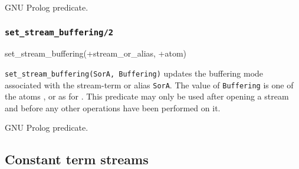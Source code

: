 \Portability

GNU Prolog predicate.

\subsubsection{\texttt{set\_stream\_buffering/2}}
\label{set-stream-buffering/2}

\begin{TemplatesOneCol}
set\_stream\_buffering(+stream\_or\_alias, +atom)

\end{TemplatesOneCol}

\Description

\texttt{set\_stream\_buffering(SorA, Buffering)}
updates the buffering mode associated with the stream-term or alias
\texttt{SorA}. The value of \texttt{Buffering} is one of the atoms
,  or  as for 
. This predicate may only be used after opening a stream
and before any other operations have been performed on it.

\begin{PlErrors}






\end{PlErrors}

\Portability

GNU Prolog predicate.

\subsection{Constant term streams}
\label{Constant-term-streams}

